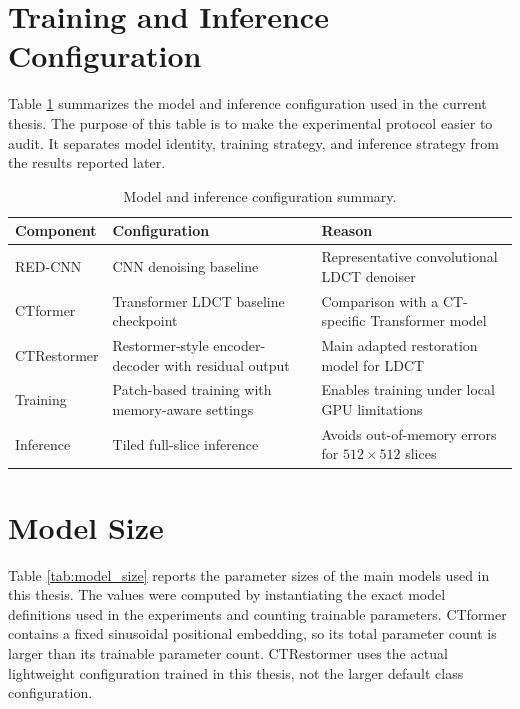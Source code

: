 \section{Training and Inference Configuration}

Table \ref{tab:model_config} summarizes the model and inference configuration used in the current thesis. The purpose of this table is to make the experimental protocol easier to audit. It separates model identity, training strategy, and inference strategy from the results reported later.

\begin{table}[!htbp]
    \centering
    \caption{Model and inference configuration summary.}
    \renewcommand{\arraystretch}{1.35}
    \begin{tabular*}{\textwidth}{>{\raggedright\arraybackslash}p{}|>{\raggedright\arraybackslash}p{}|>{\raggedright\arraybackslash}p{}}
        \hline
        Component & Configuration & Reason \\
        \hline
        RED-CNN & CNN denoising baseline & Representative convolutional LDCT denoiser \\
        \hline
        CTformer & Transformer LDCT baseline checkpoint & Comparison with a CT-specific Transformer model \\
        \hline
        CTRestormer & Restormer-style encoder-decoder with residual output & Main adapted restoration model for LDCT \\
        \hline
        Training & Patch-based training with memory-aware settings & Enables training under local GPU limitations \\
        \hline
        Inference & Tiled full-slice inference & Avoids out-of-memory errors for \(512 \times 512\) slices \\
        \hline
    \end{tabular*}
    \label{tab:model_config}
\end{table}

\section{Model Size}

Table \ref{tab:model_size} reports the parameter sizes of the main models used in this thesis. The values were computed by instantiating the exact model definitions used in the experiments and counting trainable parameters. CTformer contains a fixed sinusoidal positional embedding, so its total parameter count is larger than its trainable parameter count. CTRestormer uses the actual lightweight configuration trained in this thesis, not the larger default class configuration.

